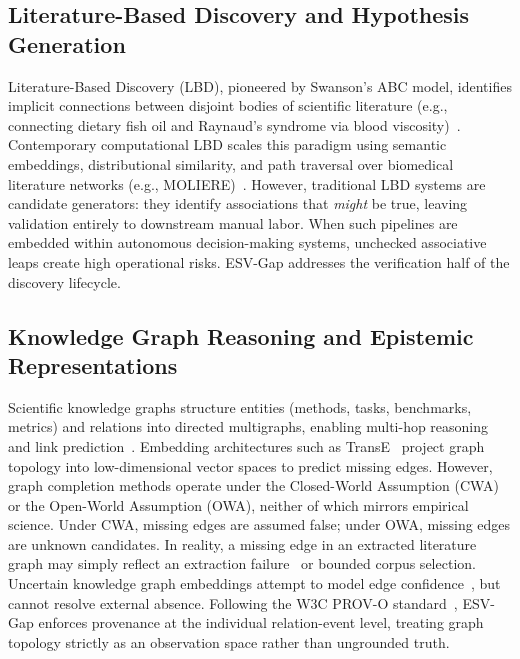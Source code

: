\documentclass[conference,10pt]{IEEEtran}
\newcommand{\method}{ESV-Gap}
\begin{document}
\subsection{Literature-Based Discovery and Hypothesis Generation}
Literature-Based Discovery (LBD), pioneered by Swanson's ABC model, identifies implicit connections between disjoint bodies of scientific literature (e.g., connecting dietary fish oil and Raynaud's syndrome via blood viscosity)~\cite{swanson1986fish}. Contemporary computational LBD scales this paradigm using semantic embeddings, distributional similarity, and path traversal over biomedical literature networks (e.g., MOLIERE)~\cite{moliere}. However, traditional LBD systems are candidate generators: they identify associations that \emph{might} be true, leaving validation entirely to downstream manual labor. When such pipelines are embedded within autonomous decision-making systems, unchecked associative leaps create high operational risks. \method{} addresses the verification half of the discovery lifecycle.

\subsection{Knowledge Graph Reasoning and Epistemic Representations}
Scientific knowledge graphs structure entities (methods, tasks, benchmarks, metrics) and relations into directed multigraphs, enabling multi-hop reasoning and link prediction~\cite{schneider2022decade}. Embedding architectures such as TransE~\cite{bordes2013transe} project graph topology into low-dimensional vector spaces to predict missing edges. However, graph completion methods operate under the Closed-World Assumption (CWA) or the Open-World Assumption (OWA), neither of which mirrors empirical science. Under CWA, missing edges are assumed false; under OWA, missing edges are unknown candidates. In reality, a missing edge in an extracted literature graph may simply reflect an extraction failure~\cite{kim2026graphrefine} or bounded corpus selection. Uncertain knowledge graph embeddings attempt to model edge confidence~\cite{chen2019ukge}, but cannot resolve external absence. Following the W3C PROV-O standard~\cite{lebo2013provo}, \method{} enforces provenance at the individual relation-event level, treating graph topology strictly as an observation space rather than ungrounded truth.
\end{document}
